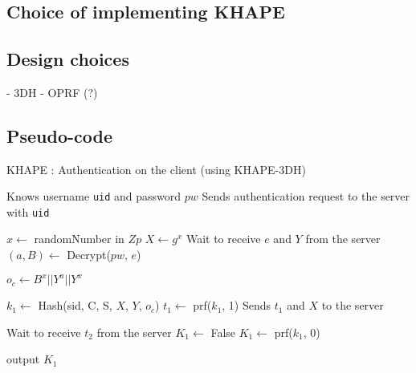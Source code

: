 \documentclass[../report.tex]{subfiles}
\begin{document}
\chapter{}

\section{Choice of implementing KHAPE}

\section{Design choices}
- 3DH
- OPRF (?)


\section{Pseudo-code}


\begin{algorithm}
\caption{KHAPE : Authentication on the client (using KHAPE-3DH)}
\label{euclid}
\begin{algorithmic}
\Require Knows username \verb|uid| and password $pw$
\State Sends authentication request to the server with \verb|uid|

\State $x \gets$ randomNumber in $Zp$
\State $X \gets g^x$
\State Wait to receive $e$ and $Y$ from the server
\State $(a, B) \gets$ Decrypt($pw$, $e$)

    \State $o_c \gets B^x || Y^a || Y^x$

\State $k_1 \gets$ Hash(sid, C, S, $X$, $Y$, $o_c$)
\State $t_1 \gets$ prf($k_1$, 1)
\State Sends $t_1$ and $X$ to the server


\State Wait to receive $t_2$ from the server
    \State $K_1 \gets$ False
\Else
    \State $K_1 \gets$ prf($k_1$, 0)
\EndIf

\State output $K_1$
\end{algorithmic}
\end{algorithm}
\end{document}

